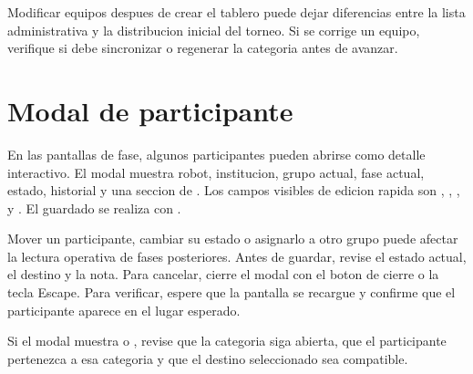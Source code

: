 \begin{advertencia}
Modificar equipos despues de crear el tablero puede dejar diferencias entre la lista administrativa y la distribucion inicial del torneo. Si se corrige un equipo, verifique si debe sincronizar o regenerar la categoria antes de avanzar.
\end{advertencia}

\section{Modal de participante}

En las pantallas de fase, algunos participantes pueden abrirse como detalle interactivo. El modal muestra robot, institucion, grupo actual, fase actual, estado, historial y una seccion de . Los campos visibles de edicion rapida son , , ,  y . El guardado se realiza con .

\begin{operacionsensible}
Mover un participante, cambiar su estado o asignarlo a otro grupo puede afectar la lectura operativa de fases posteriores. Antes de guardar, revise el estado actual, el destino y la nota. Para cancelar, cierre el modal con el boton de cierre o la tecla Escape. Para verificar, espere que la pantalla se recargue y confirme que el participante aparece en el lugar esperado.
\end{operacionsensible}

\begin{fallas}
Si el modal muestra  o , revise que la categoria siga abierta, que el participante pertenezca a esa categoria y que el destino seleccionado sea compatible.
\end{fallas}
